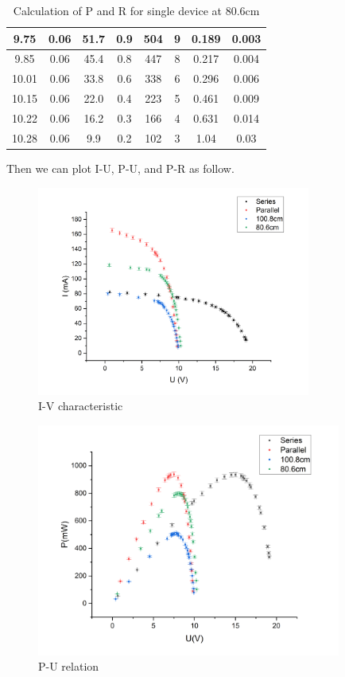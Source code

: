 \documentclass[12pt,a4paper]{article}
\begin{document}
\begin{table}[H]
\begin{tabular}{|c|c|c|c|c|c|c|c|}
    9.75     & 0.06  & 51.7      & 0.9 & 504  & 9   & 0.189  & 0.003  \\ \hline
    9.85     & 0.06  & 45.4      & 0.8 & 447  & 8   & 0.217  & 0.004  \\ \hline
    10.01    & 0.06  & 33.8      & 0.6 & 338  & 6   & 0.296  & 0.006  \\ \hline
    10.15    & 0.06  & 22.0      & 0.4 & 223  & 5   & 0.461  & 0.009  \\ \hline
    10.22    & 0.06  & 16.2      & 0.3 & 166  & 4   & 0.631  & 0.014  \\ \hline
    10.28    & 0.06  & 9.9       & 0.2 & 102  & 3   & 1.04   & 0.03   \\ \hline
    \end{tabular}
    \caption{Calculation of P and R for single device at 80.6cm}
\end{table}

Then we can plot I-U, P-U, and P-R as follow.
\begin{figure}[H]
    \centering
    \includegraphics[width=9cm]{ui.png}
    \caption{I-V characteristic}
\end{figure}

\begin{figure}[H]
    \centering
    \includegraphics[width=10cm]{up.png}
    \caption{P-U relation}
\end{figure}
\end{document}
